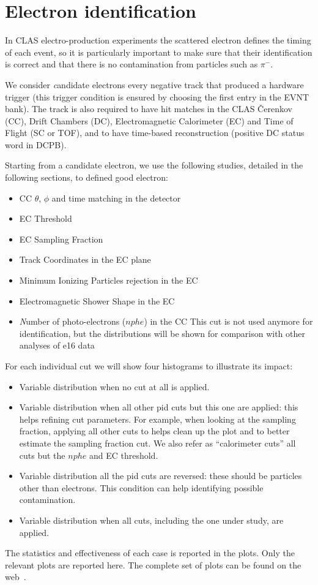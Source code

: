\clearpage\newpage


\section{Electron identification}\label{sec:electron-identification}

In CLAS electro-production experiments
the scattered electron defines the timing of each event,
so it is particularly important to
make sure that their identification is correct and that
there is no contamination from particles such as $\pi^-$.

We consider {\textit candidate electrons} every negative track
that produced a hardware trigger (this trigger condition is ensured by choosing
the first entry in the EVNT bank).
The track is also required to have hit matches in the CLAS \v Cerenkov (CC)\cite{bib:cc},
Drift Chambers (DC)\cite{bib:dc},
Electromagnetic Calorimeter (EC)\cite{bib:ec} and Time of Flight (SC or TOF)\cite{bib:ftof},
and to have time-based reconstruction (positive DC status word in DCPB).

Starting from a candidate electron, we use the following studies, detailed in the following sections,
to defined good electron:

\begin{itemize}
    \item CC $\theta$, $\phi$ and time matching in the detector
    \item EC Threshold
    \item EC Sampling Fraction
    \item Track Coordinates in the EC plane
    \item Minimum Ionizing Particles rejection in the EC
    \item Electromagnetic Shower Shape in the EC
    \item {\textit Number of photo-electrons ($nphe$) in the CC
    This cut is not used anymore for identification,
        but the distributions will be shown for comparison with other analyses of e16 data }
\end{itemize}

For each individual cut we will show four histograms to illustrate its impact:

\begin{itemize}
    \item[a.] Variable distribution when no cut at all is applied.
    \item[b.] Variable distribution when all other pid cuts but this one are applied:
    this helps refining cut parameters.
    For example, when looking at the sampling fraction, applying all other
    cuts to helps clean up the plot and to better estimate the sampling fraction cut.
    We also refer as ``calorimeter cuts'' all cuts but the $nphe$ and EC threshold.
    \item[c.] Variable distribution all the pid cuts are reversed: these should be particles other than electrons.
    This condition can help identifying possible contamination.
    \item[d.] Variable distribution when all cuts, including the one under study, are applied.
\end{itemize}

The statistics and effectiveness of each case is reported in the plots.
Only the relevant plots are reported here.
The complete set of plots can be found on the web~\cite{bib:pi0_resonance_id_electron}.
